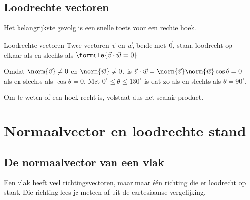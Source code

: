 \subsection{Loodrechte vectoren}

Het belangrijkste gevolg is een snelle toets voor een rechte hoek.

\begin{theorie}
\begin{stelling}{Loodrechte vectoren}
Twee vectoren $\vec v$ en $\vec w$, beide niet $\vec 0$, staan loodrecht op elkaar als en slechts als \quad $\formule{\vec v \cdot \vec w = 0}$
\end{stelling}
\begin{bewijs}
Omdat $\norm{\vec v} \neq 0$ en $\norm{\vec w} \neq 0$, is $\vec v \cdot \vec w = \norm{\vec v}\norm{\vec w}\cos\theta = 0$ als en slechts als $\cos\theta = 0$. Met $0^\circ \leqslant \theta \leqslant 180^\circ$ is dat zo als en slechts als $\theta = 90^\circ$.
\end{bewijs}
\end{theorie}

Om te weten of een hoek recht is, volstaat dus het scalair product.


\begin{oefeningen}
\end{oefeningen}

\section{Normaalvector en loodrechte stand}

\subsection{De normaalvector van een vlak}

Een vlak heeft veel richtingsvectoren, maar maar één richting die er loodrecht op staat. Die richting lees je meteen af uit de cartesiaanse vergelijking.

